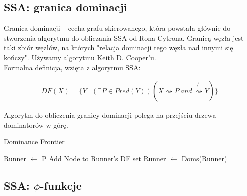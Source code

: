 	\subsection{SSA: granica dominacji}
	
	    Granica dominacji -- cecha grafu skierowanego, która powstała głównie do stworzenia algorytmu
	    do obliczania SSA od Rona Cytrona. Granicą węzła jest taki zbiór węzłów, na których
	    "relacja dominacji tego węzła nad innymi się kończy". Używamy algorytmu Keith D. Cooper'u.
	    \\
	    
	    Formalna definicja, wzięta z algorytmu SSA:

		\begin{equation*}
		\begin{split}
			DF(X) = \{ Y \ | \ (\exists P \in Pred(Y)) (X \rightsquigarrow P \ and \
			                                         \not{\rightsquigarrow} Y) \}
		\end{split}
		\end{equation*}

        Algorytm do obliczenia granicy dominacji polega na przejściu drzewa dominatorów w górę.
	
		\begin{algorithm}
			\caption{Dominance Frontier}
			\begin{algorithmic}[1]

			        \State Runner $\gets$ P
			            \State Add Node to Runner's DF set
			            \State Runner $\gets$ Doms(Runner)
			        \EndWhile
			        \EndFor
			    \EndIf
			\EndProcedure

			\end{algorithmic}
		\end{algorithm}

	\subsection{SSA: $\phi$-funkcje}
